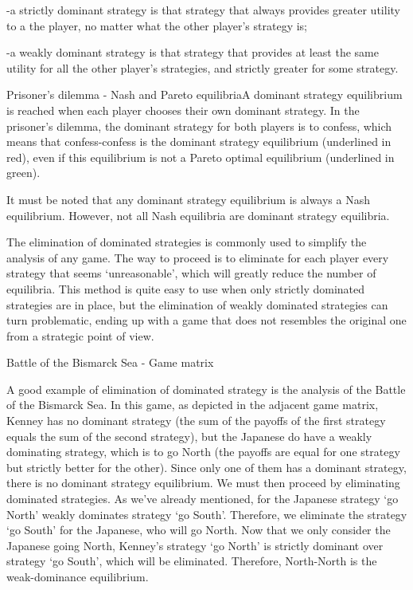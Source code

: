 -a strictly dominant strategy is that strategy that always provides greater utility to a the player, no matter what the other player’s strategy is;

-a weakly dominant strategy is that strategy that provides at least the same utility for all the other player’s strategies, and strictly greater for some strategy.

 

Prisoner's dilemma - Nash and Pareto equilibriaA dominant strategy equilibrium is reached when each player chooses their own dominant strategy. In the prisoner’s dilemma, the dominant strategy for both players is to confess, which means that confess-confess is the dominant strategy equilibrium (underlined in red), even if this equilibrium is not a Pareto optimal equilibrium (underlined in green).

It must be noted that any dominant strategy equilibrium is always a Nash equilibrium. However, not all Nash equilibria are dominant strategy equilibria.

 

The elimination of dominated strategies is commonly used to simplify the analysis of any game. The way to proceed is to eliminate for each player every strategy that seems ‘unreasonable’, which will greatly reduce the number of equilibria. This method is quite easy to use when only strictly dominated strategies are in place, but the elimination of weakly dominated strategies can turn problematic, ending up with a game that does not resembles the original one from a strategic point of view.

Battle of the Bismarck Sea - Game matrix

A good example of elimination of dominated strategy is the analysis of the Battle of the Bismarck Sea. In this game, as depicted in the adjacent game matrix, Kenney has no dominant strategy (the sum of the payoffs of the first strategy equals the sum of the second strategy), but the Japanese do have a weakly dominating strategy, which is to go North (the payoffs are equal for one strategy but strictly better for the other). Since only one of them has a dominant strategy, there is no dominant strategy equilibrium. We must then proceed by eliminating dominated strategies. As we’ve already mentioned, for the Japanese strategy ‘go North’ weakly dominates strategy ‘go South’. Therefore, we eliminate the strategy ‘go South’ for the Japanese, who will go North. Now that we only consider the Japanese going North, Kenney’s strategy ‘go North’ is strictly dominant over strategy ‘go South’, which will be eliminated. Therefore, North-North is the weak-dominance equilibrium.

